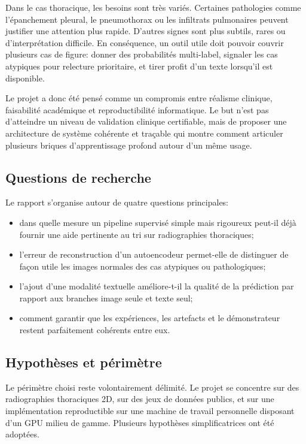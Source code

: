 \documentclass[11pt,a4paper]{article}
\begin{document}
Dans le cas thoracique, les besoins sont tr\`es vari\'es. Certaines pathologies comme l'\'epanchement pleural, le pneumothorax ou les infiltrats pulmonaires peuvent justifier une attention plus rapide. D'autres signes sont plus subtils, rares ou d'interpr\'etation difficile. En cons\'equence, un outil utile doit pouvoir couvrir plusieurs cas de figure: donner des probabilit\'es multi-label, signaler les cas atypiques pour relecture prioritaire, et tirer profit d'un texte lorsqu'il est disponible.

Le projet a donc \'et\'e pens\'e comme un compromis entre r\'ealisme clinique, faisabilit\'e acad\'emique et reproductibilit\'e informatique. Le but n'est pas d'atteindre un niveau de validation clinique certifiable, mais de proposer une architecture de syst\`eme coh\'erente et tra\c{c}able qui montre comment articuler plusieurs briques d'apprentissage profond autour d'un m\^eme usage.

\subsection{Questions de recherche}
Le rapport s'organise autour de quatre questions principales:
\begin{itemize}
    \item dans quelle mesure un pipeline supervis\'e simple mais rigoureux peut-il d\'ej\`a fournir une aide pertinente au tri sur radiographies thoraciques;
    \item l'erreur de reconstruction d'un autoencodeur permet-elle de distinguer de fa\c{c}on utile les images normales des cas atypiques ou pathologiques;
    \item l'ajout d'une modalit\'e textuelle am\'eliore-t-il la qualit\'e de la pr\'ediction par rapport aux branches image seule et texte seul;
    \item comment garantir que les exp\'eriences, les artefacts et le d\'emonstrateur restent parfaitement coh\'erents entre eux.
\end{itemize}

\subsection{Hypoth\`eses et p\'erim\`etre}
Le p\'erim\`etre choisi reste volontairement d\'elimit\'e. Le projet se concentre sur des radiographies thoraciques 2D, sur des jeux de donn\'ees publics, et sur une impl\'ementation reproductible sur une machine de travail personnelle disposant d'un GPU milieu de gamme. Plusieurs hypoth\`eses simplificatrices ont \'et\'e adopt\'ees.
\end{document}
